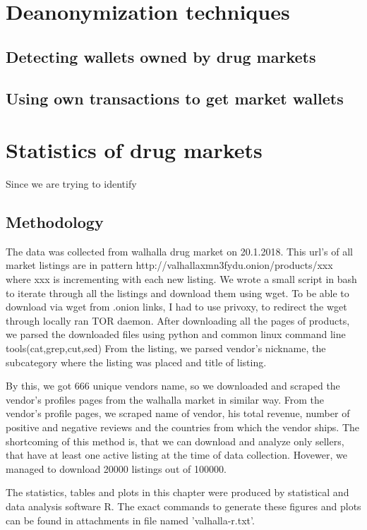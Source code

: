 \documentclass[
  digital, %
  table,   %
  lof,     %
  lot,     %
  oneside
]{fithesis3}
\begin{document}
\chapter{Deanonymization techniques}
\section{Detecting wallets owned by drug markets}
\section{Using own transactions to get market wallets}

\chapter{Statistics of drug markets}
Since we are trying to identify 


\section{Methodology}
The data was collected from walhalla drug market on 20.1.2018.
This url's of all market listings are in pattern http://valhallaxmn3fydu.onion/products/xxx where 
xxx is incrementing with each new listing.
We wrote a small script in bash to iterate through all the listings and download them using wget.
To be able to download via wget from .onion links, I had to use privoxy, to redirect the wget through locally ran TOR daemon.
After downloading all the pages of products, we parsed the downloaded files using python and common linux command 
line tools(cat,grep,cut,sed)
From the listing, we parsed vendor's nickname, the subcategory where the listing was placed and title of listing.

By this, we got 666 unique vendors name, so we downloaded and scraped the vendor's profiles pages from the walhalla 
market in similar way.
From the vendor's profile pages, we scraped name of vendor, his total revenue, number of positive and negative reviews 
and the countries from which the vendor ships.
The shortcoming of this method is, that we can download and analyze only sellers, 
that have at least one active listing at the time of data collection. 
Hovewer, we managed to download 20000 listings out of 100000.

The statistics, tables and plots in this chapter were produced by statistical and data analysis software R.
The exact commands to generate these figures and plots can be found in attachments in file named 'valhalla-r.txt'.
\end{document}
